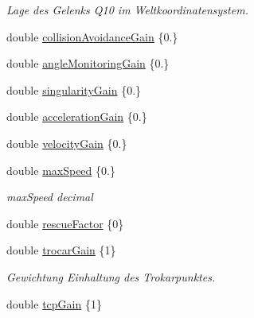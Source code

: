 \begin{DoxyCompactItemize}
\begin{DoxyCompactList}\small\item\em Lage des Gelenks Q10 im Weltkoordinatensystem. \end{DoxyCompactList}\item 
double \hyperlink{classNumericKinematic_a2e5991d67d0e27b171a1ef8f4b759913}{collision\-Avoidance\-Gain} \{0.\}
\item 
double \hyperlink{classNumericKinematic_abcb83da2f2e4934765c8522ac0569405}{angle\-Monitoring\-Gain} \{0.\}
\item 
double \hyperlink{classNumericKinematic_ab64580c565b5ddcadb7de6fc6d5bd766}{singularity\-Gain} \{0.\}
\item 
double \hyperlink{classNumericKinematic_a3f76ee7066ac853557b44fb1b46689cb}{acceleration\-Gain} \{0.\}
\item 
double \hyperlink{classNumericKinematic_a3c0bd5b51e9bf070bd2570928feb1cc6}{velocity\-Gain} \{0.\}
\item 
\hypertarget{classNumericKinematic_a668ce168ed4a3e917f95304153755788}{double \hyperlink{classNumericKinematic_a668ce168ed4a3e917f95304153755788}{max\-Speed} \{0.\}}\label{classNumericKinematic_a668ce168ed4a3e917f95304153755788}

\begin{DoxyCompactList}\small\item\em max\-Speed decimal \end{DoxyCompactList}\item 
double \hyperlink{classNumericKinematic_a6691d8d0fa2579cc4408acec0d2e864b}{rescue\-Factor} \{0\}
\item 
\hypertarget{classNumericKinematic_a90d84f5207c4c6a956022ba26e3212ad}{double \hyperlink{classNumericKinematic_a90d84f5207c4c6a956022ba26e3212ad}{trocar\-Gain} \{1\}}\label{classNumericKinematic_a90d84f5207c4c6a956022ba26e3212ad}

\begin{DoxyCompactList}\small\item\em Gewichtung Einhaltung des Trokarpunktes. \end{DoxyCompactList}\item 
\hypertarget{classNumericKinematic_a3ca1ed22eb6d87ca796366015e1709d4}{double \hyperlink{classNumericKinematic_a3ca1ed22eb6d87ca796366015e1709d4}{tcp\-Gain} \{1\}}\label{classNumericKinematic_a3ca1ed22eb6d87ca796366015e1709d4}


\end{DoxyCompactItemize}

